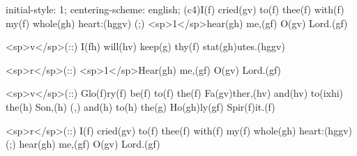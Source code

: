 initial-style: 1;
centering-scheme: english;
(c4)I(f) cried(gv) to(f) thee(f) with(f) my(f) whole(gh) heart:(hggv) (;) <sp>1</sp>hear(gh) me,(gf) O(gv) Lord.(gf)

<sp>v</sp>(::) I(fh) will(hv) keep(g) thy(f) stat(gh)utes.(hggv)

<sp>r</sp>(::) <sp>1</sp>Hear(gh) me,(gf) O(gv) Lord.(gf)

<sp>v</sp>(::) Glo(f)ry(f) be(f) to(f) the(f) Fa(gv)ther,(hv) and(hv) to(ixhi) the(h) Son,(h) (,) and(h) to(h) the(g) Ho(gh)ly(gf) Spir(f)it.(f)

<sp>r</sp>(::) I(f) cried(gv) to(f) thee(f) with(f) my(f) whole(gh) heart:(hggv) (;) hear(gh) me,(gf) O(gv) Lord.(gf)
